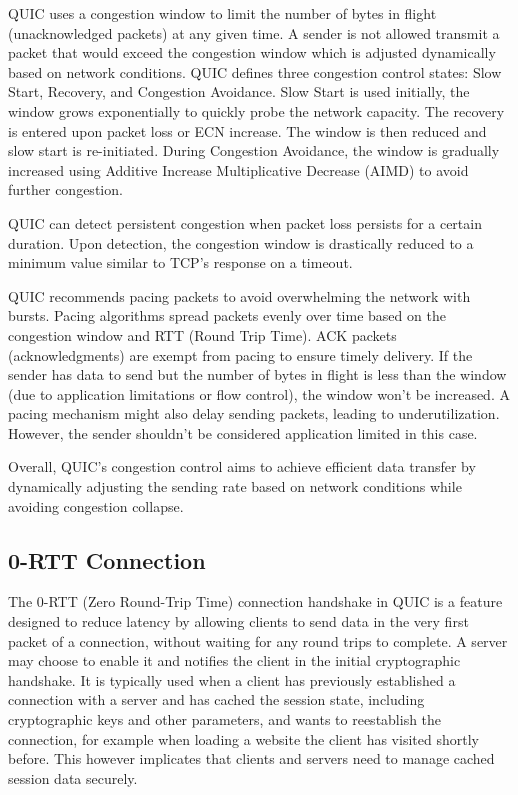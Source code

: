 QUIC uses a congestion window to limit the number of bytes in flight (unacknowledged packets) at any given time. A sender is not allowed
transmit a packet that would exceed the congestion window which is adjusted dynamically based on network conditions. QUIC defines
three congestion control states: Slow Start, Recovery, and Congestion Avoidance. Slow Start is used initially, the window grows
exponentially to quickly probe the network capacity. The recovery is entered upon packet loss or ECN increase. The window is
then reduced and slow start is re-initiated. During Congestion Avoidance, the window is gradually increased using Additive
Increase Multiplicative Decrease (AIMD) to avoid further congestion.

QUIC can detect persistent congestion when packet loss persists for a certain duration. Upon detection, the congestion window is
drastically reduced to a minimum value similar to TCP's response on a timeout.

QUIC recommends pacing packets to avoid overwhelming the network with bursts. Pacing algorithms spread packets evenly over time
based on the congestion window and RTT (Round Trip Time). ACK packets (acknowledgments) are exempt from pacing to ensure timely delivery.
If the sender has data to send but the number of bytes in flight is less than the window (due to application limitations or flow control),
the window won't be increased. A pacing mechanism might also delay sending packets, leading to underutilization. However, the sender
shouldn't be considered application limited in this case.

Overall, QUIC's congestion control aims to achieve efficient data transfer by dynamically adjusting the sending rate based on network
conditions while avoiding congestion collapse.

\subsection{0-RTT Connection} \label{zero_rtt}

The 0-RTT (Zero Round-Trip Time) connection handshake in QUIC is a feature designed to reduce latency by allowing clients to send
data in the very first packet of a connection, without waiting for any round trips to complete. A server may choose to enable it
and notifies the client in the initial cryptographic handshake. It is typically used when a client has previously established a
connection with a server and has cached the session state, including cryptographic keys and other parameters, and wants to
reestablish the connection, for example when loading a website the client has visited shortly before. This however implicates
that clients and servers need to manage cached session data securely.

